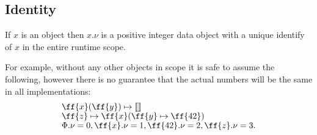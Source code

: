 \subsection{Identity}

\begin{eodefinition}\label{def:identity}
If $x$ is an object then $x.\nu$ is a positive integer data object
with a unique identify of $x$ in the entire runtime scope.
\end{eodefinition}

For example, without any other objects in scope it is safe
to assume the following, however there is no guarantee that
the actual numbers will be the same in all implementations:
\begin{equation}
\begin{split}
& \ff{x}(\ff{y}) \mapsto \llbracket \rrbracket \br
& \ff{z} \mapsto \ff{x} ( \ff{y} \mapsto \ff{42} ) \br
& \Phi.\nu = 0, \ff{x}.\nu = 1, \ff{42}.\nu = 2, \ff{z}.\nu = 3.
\end{split}
\end{equation}


